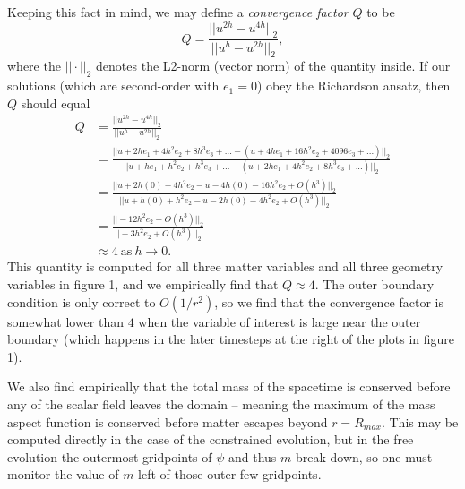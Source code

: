 \documentclass[12pt]{article}
\numberwithin{equation}{section}
\begin{document}
Keeping this fact in mind, we may define a \textit{convergence factor} $Q$ to be
\begin{equation}
Q = \frac{|| u^{2h} - u^{4h} ||_2}{|| u^h - u^{2h} ||_2},
\end{equation}
where the $||\cdot||_2$ denotes the L2-norm (vector norm) of the quantity inside.  If our solutions (which are second-order with $e_1 = 0$) obey the Richardson ansatz, then $Q$ should equal
\begin{equation}
\begin{aligned}
Q &= \frac{|| u^{2h} - u^{4h} ||_2}{|| u^h - u^{2h} ||_2} \\
&= \frac{|| u + 2 h e_1 + 4 h^2 e_2 + 8 h^3 e_3 + ... - (u + 4 h e_1 + 16 h^2 e_2 + 4096 e_3 + ...) ||_2}{|| u + h e_1 + h^2 e_2 + h^3 e_3 + ... - (u + 2 h e_1 + 4 h^2 e_2 + 8 h^3 e_3 + ...) ||_2} \\
&= \frac{|| u + 2 h (0) + 4 h^2 e_2 - u - 4 h (0) - 16 h^2 e_2 + O(h^3) ||_2}{|| u + h (0) + h^2 e_2 - u - 2 h (0) - 4 h^2 e_2 + O(h^3) ||_2} \\
&= \frac{|| - 12 h^2 e_2 + O(h^3) ||_2}{|| - 3 h^2 e_2 + O(h^3) ||_2} \\
&\approx 4 ~\mathrm{as~} h \to 0.
\end{aligned}
\end{equation}
This quantity is computed for all three matter variables and all three geometry variables in figure 1, and we empirically find that $Q \approx 4$.  The outer boundary condition is only correct to $O(1/r^2)$, so we find that the convergence factor is somewhat lower than $4$ when the variable of interest is large near the outer boundary (which happens in the later timesteps at the right of the plots in figure 1).

We also find empirically that the total mass of the spacetime is conserved before any of the scalar field leaves the domain -- meaning the maximum of the mass aspect function is conserved before matter escapes beyond $r = R_{max}$.  This may be computed directly in the case of the constrained evolution, but in the free evolution the outermost gridpoints of $\psi$ and thus $m$ break down, so one must monitor the value of $m$ left of those outer few gridpoints.
\end{document}
